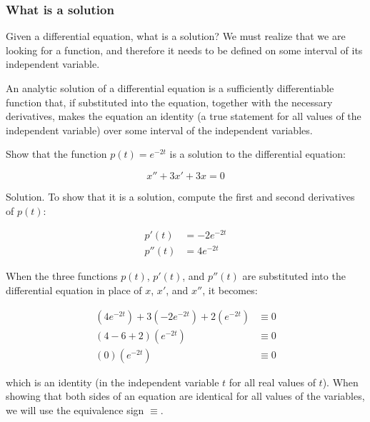   \subsubsection{What is a solution}

    Given a differential equation, what is a solution? We must realize that we are looking for a function, and therefore it needs to be defined on some interval of its independent variable.

    \begin{definition}
      An analytic solution of a differential equation is a sufficiently differentiable function that, if substituted into the equation, together with the necessary derivatives, makes the equation an identity (a true statement for all values of the independent variable) over some interval of the independent variables.
    \end{definition}

    \begin{problem}
      Show that the function $p(t)=e^{-2t}$ is a solution to the differential equation:

      \[
        x'' + 3x' + 3x = 0
      \]
  
      Solution. To show that it is a solution, compute the first and second derivatives of $p(t)$:
  
      \begin{align*}
        p'(t) &=- 2e^{ - 2t}\\
        p''(t) &= 4e^{ - 2t}
      \end{align*}
  
      When the three functions $p(t)$, $p'(t)$, and $p''(t)$ are substituted into the differential equation in place of $x$, $x'$, and $x''$, it becomes:
  
      \begin{align*}
        (4e^{ - 2t}) + 3( - 2e^{ - 2t}) + 2(e^{ - 2t})&\equiv 0\\
        (4 - 6 + 2)(e^{ - 2t})&\equiv0\\
        (0)(e^{ - 2t})&\equiv0
      \end{align*}
  
      which is an identity (in the independent variable $t$ for all real values of $t$).
      When showing that both sides of an equation are identical for all values of the variables, we will use the equivalence sign $\equiv$.
    \end{problem}

